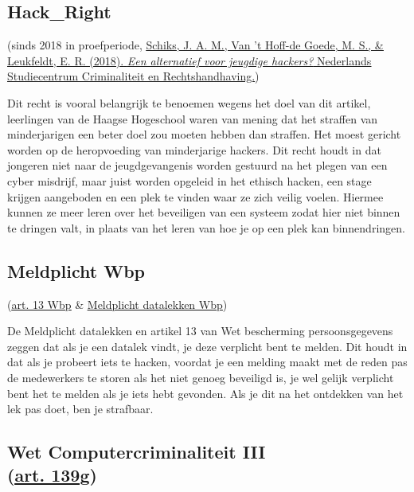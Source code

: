 \documentclass[
]{article}
\begin{document}
\hypertarget{hack_right}{%
\subsection{Hack\_Right}\label{hack_right}}

(sinds 2018 in proefperiode,
\href{https://www.dehaagsehogeschool.nl/docs/default-source/documenten-onderzoek/lectoraten/cybersecurity-in-het-mkb/hack_right.pdf}{\underline{Schiks,
J. A. M., Van 't Hoff-de Goede, M. S., \newline \& Leukfeldt, E. R. (2018).}
\emph{\underline{Een alternatief voor jeugdige hackers?}}
\newline
\underline{Nederlands Studiecentrum Criminaliteit en
Rechtshandhaving.}})

Dit recht is vooral belangrijk te benoemen wegens het doel van dit
artikel, leerlingen van de Haagse Hogeschool waren van mening dat het
straffen van minderjarigen een beter doel zou moeten hebben dan
straffen. Het moest gericht worden op de heropvoeding van minderjarige
hackers. Dit recht houdt in dat jongeren niet naar de jeugdgevangenis
worden gestuurd na het plegen van een cyber misdrijf, maar juist worden
opgeleid in het ethisch hacken, een stage krijgen aangeboden en een plek
te vinden waar ze zich veilig voelen. Hiermee kunnen ze meer leren over
het beveiligen van een systeem zodat hier niet binnen te dringen valt,
in plaats van het leren van hoe je op een plek kan binnendringen.

\hypertarget{meldplicht-wbp}{%
\subsection{Meldplicht Wbp}\label{meldplicht-wbp}}

(\href{https://wetten.overheid.nl/jci1.3:c:BWBR0011468\&hoofdstuk=2\&paragraaf=1\&artikel=13\&z=2018-05-01\&g=2018-05-01}{\underline{art.
13 Wbp}} \&
\href{https://wetten.overheid.nl/BWBR0037346/2015-12-16}{\underline{Meldplicht
datalekken Wbp}})

De Meldplicht datalekken en artikel 13 van Wet bescherming
persoonsgegevens zeggen dat als je een datalek vindt, je deze verplicht
bent te melden. Dit houdt in dat als je probeert iets te hacken, voordat
je een melding maakt met de reden pas de medewerkers te storen als het
niet genoeg beveiligd is, je wel gelijk verplicht bent het te melden als
je iets hebt gevonden. Als je dit na het ontdekken van het lek pas doet,
ben je strafbaar.

\hypertarget{wet-computercriminaliteit-iii-art.-139g}{%
\subsection{\texorpdfstring{Wet Computercriminaliteit III\\
(\href{https://wetten.overheid.nl/jci1.3:c:BWBR0001854\&boek=Tweede\&titeldeel=V\&artikel=139g\&z=2021-07-01\&g=2021-07-01}{\underline{art.
139g}})}{Wet Computercriminaliteit III (art. 139g)}}\label{wet-computercriminaliteit-iii-art.-139g}}
\end{document}
